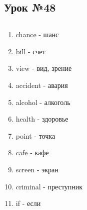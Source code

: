 \subsection{Урок №48}

\subsection*{}
\begin{multicols}{2}
    \begin{enumerate}\setlength{\itemsep}{0pt}
        \item chance - шанс
        \item bill - счет
        \item view - вид, зрение
        \item accident - авария
        \item alcohol - алкоголь
        \item health - здоровье
        \item point - точка
        \item cafe - кафе
        \item screen - экран
        \item criminal - преступник
        \item if - если
    \end{enumerate}
\end{multicols}